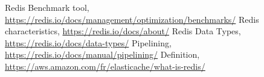 \documentclass[runningheads]{llncs}
\begin{document}
\newpage
\begin{thebibliography}{8}
Redis Benchmark tool, \url{https://redis.io/docs/management/optimization/benchmarks/}
Redis characteristics, \url{https://redis.io/docs/about/}
Redis Data Types, \url{https://redis.io/docs/data-types/}
Pipelining, \url{https://redis.io/docs/manual/pipelining/}
Definition, \url{https://aws.amazon.com/fr/elasticache/what-is-redis/}
\end{thebibliography}
\end{document}
